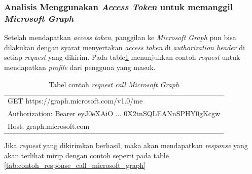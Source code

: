 \subsubsection{Analisis Menggunakan \textit{Access Token} untuk memanggil \textit{Microsoft Graph}}
\label{analisis_menggunakan_access_token}
Setelah mendapatkan \textit{access token}, panggilan ke \textit{Microsoft Graph} pun bisa dilakukan dengan syarat menyertakan \textit{access token} di \textit{authorization header} di setiap \textit{request} yang dikirim. Pada table\ref{tab:contoh_request_call_microsoft_graph} menunjukkan contoh \textit{request} untuk mendapatkan \textit{profile} dari pengguna yang masuk. 

\begin{table}[H]
	\centering 
	\caption{Tabel contoh \textit{request} \textit{call Microsoft Graph}}
	\label{tab:contoh_request_call_microsoft_graph}
	\begin{tabular}{|p{9cm}|}
	\toprule
	GET https://graph.microsoft.com/v1.0/me \\
Authorization: Bearer eyJ0eXAiO ... 0X2tnSQLEANnSPHY0gKcgw\\
Host: graph.microsoft.com \\
	\bottomrule
	\end{tabular}  
\end{table}

Jika \textit{request} yang dikirimkan berhasil, maka akan mendapatkan \textit{response} yang akan terlihat mirip dengan contoh seperti pada table \ref{tab:contoh_response_call_microsoft_graph}

